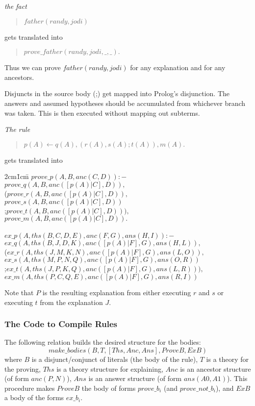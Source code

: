 \begin{example} \em the fact
\begin{quote}
$father(randy,jodi)$
\end{quote}
gets translated into
\begin{quote}
$prove\_father(randy,jodi,\_,\_).$
\end{quote}
Thus we can prove $father(randy,jodi)$ for any explanation and
for any ancestors.
\end{example}

Disjuncts in the source body (;) get mapped into Prolog's disjunction.
The answers and assumed hypotheses should be accumulated from
whichever branch was taken.
This is then executed without mapping out subterms.
\begin{example} \em
The rule
\begin{quote}
$p(A) \leftarrow q(A),(r(A),s(A);t(A)),m(A).$
\end{quote}
gets translated into
\begin{tabbing}\hbox{2cm}\=\hbox{1cm}\=\kill
$prove\_p(A,B,anc(C,D)):-$\\
\>$prove\_q(A,B,anc([p(A)|C],D)),$\\
\>(\>$prove\_r(A,B,anc([p(A)|C],D)),$\\
\>\>$prove\_s(A,B,anc([p(A)|C],D))$\\
\>;\>$prove\_t(A,B,anc([p(A)|C],D))),$\\
\>$prove\_m(A,B,anc([p(A)|C],D)).$\\\\

$ex\_p(A,ths(B,C,D,E),anc(F,G),ans(H,I)):-$\\
\>$ex\_q(A,ths(B,J,D,K),anc([p(A)|F],G),ans(H,L)),$\\
\>(\>$ex\_r(A,ths(J,M,K,N),anc([p(A)|F],G),ans(L,O)),$\\
\>\>$ex\_s(A,ths(M,P,N,Q),anc([p(A)|F],G),ans(O,R))$\\
\>;\>$ex\_t(A,ths(J,P,K,Q),anc([p(A)|F],G),ans(L,R))),$\\
\>$ex\_m(A,ths(P,C,Q,E),anc([p(A)|F],G),ans(R,I))$
\end{tabbing}
Note that $P$ is the resulting explanation from either executing
$r$ and $s$ or executing $t$ from the explanation $J$.
\end{example}

\subsubsection{The Code to Compile Rules}
The following relation builds the desired structure for the bodies:
\[make\_bodies(B,T,[Ths,Anc,Ans],ProveB,ExB)\]
where $B$ is a disjunct/conjunct of literals (the body
of the rule), $T$ is a theory for the proving,
$Ths$ is a theory structure for explaining,
$Anc$ is an ancestor
structure (of form $anc(P,N)$), $Ans$ is an answer structure
(of form $ans(A0,A1)$). This procedure
makes $ProveB$ the body of forms $prove\_b_i$ (and $prove\_not\_b_i$),
and $ExB$ a body of the forms $ex\_b_i$.


